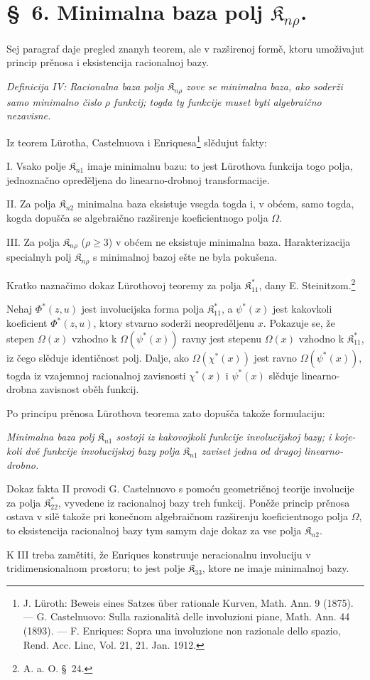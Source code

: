 \documentclass[11pt]{article}
\providecommand{\Kfield}{\mathfrak{K}}
\begin{document}
\section*{\S\ 6. Minimalna baza polj $\Kfield_{n\rho}$.}

Sej paragraf daje pregled znanyh teorem, ale v razširenoj formě, ktoru umoživajut princip prěnosa i eksistencija racionalnoj bazy.

{\itshape Definicija IV: Racionalna baza polja $\Kfield_{n\rho}$ zove se minimalna baza, ako soderži samo minimalno čislo $\rho$ funkcij; togda ty funkcije muset byti algebraično nezavisne.}

Iz teorem Lürotha, Castelnuova i Enriquesa\footnote{J. Lüroth: Beweis eines Satzes über rationale Kurven, Math. Ann. 9 (1875). --- G. Castelnuovo: Sulla razionalità delle involuzioni piane, Math. Ann. 44 (1893). --- F. Enriques: Sopra una involuzione non razionale dello spazio, Rend. Acc. Linc, Vol. 21, 21. Jan. 1912.} slědujut fakty:

I. Vsako polje $\Kfield_{n1}$ imaje minimalnu bazu: to jest Lürothova funkcija togo polja, jednoznačno opreděljena do linearno-drobnoj transformacije.

II. Za polja $\Kfield_{n2}$ minimalna baza eksistuje vsegda togda i, v obćem, samo togda, kogda dopušča se algebraično razširenje koeficientnogo polja $\Omega$.

III. Za polja $\Kfield_{n\rho}$ ($\rho\ge3$) v obćem ne eksistuje minimalna baza. Harakterizacija specialnyh polj $\Kfield_{n\rho}$ s minimalnoj bazoj ešte ne byla pokušena.

Kratko naznačimo dokaz Lürothovoj teoremy za polja $\Kfield^*_{11}$, dany E. Steinitzom.\footnote{A. a. O. \S\ 24.}

Nehaj $\Phi^*(z,u)$ jest involucijska forma polja $\Kfield^*_{11}$, a $\psi^*(x)$ jest kakovkoli koeficient $\Phi^*(z,u)$, ktory stvarno soderži neopreděljenu $x$. Pokazuje se, že stepen $\Omega(x)$ vzhodno k $\Omega(\psi^*(x))$ ravny jest stepenu $\Omega(x)$ vzhodno k $\Kfield^*_{11}$, iz čego slěduje identičnost polj. Dalje, ako $\Omega(\chi^*(x))$ jest ravno $\Omega(\psi^*(x))$, togda iz vzajemnoj racionalnoj zavisnosti $\chi^*(x)$ i $\psi^*(x)$ slěduje linearno-drobna zavisnost oběh funkcij.

Po principu prěnosa Lürothova teorema zato dopušča takože formulaciju:

{\itshape Minimalna baza polj $\Kfield_{n1}$ sostoji iz kakovojkoli funkcije involucijskoj bazy; i koje-koli dvě funkcije involucijskoj bazy polja $\Kfield_{n1}$ zaviset jedna od drugoj linearno-drobno.}

Dokaz fakta II provodi G. Castelnuovo s pomoću geometričnoj teorije involucije za polja $\Kfield^*_{22}$, vyvedene iz racionalnoj bazy treh funkcij. Poněže princip prěnosa ostava v silě takože pri konečnom algebraičnom razširenju koeficientnogo polja $\Omega$, to eksistencija racionalnoj bazy tym samym daje dokaz za vse polja $\Kfield_{n2}$.

K III treba zamětiti, že Enriques konstruuje neracionalnu involuciju v tridimensionalnom prostoru; to jest polje $\Kfield_{33}$, ktore ne imaje minimalnoj bazy.
\end{document}
